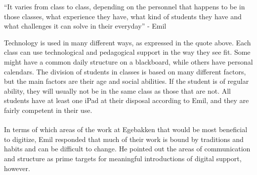 \begin{displayquote}
    ``It varies from class to class, depending on the personnel that happens to be in those classes, what experience they have, what kind of students they have and what challenges it can solve in their everyday'' - Emil
\end{displayquote}
Technology is used in many different ways, as expressed in the quote above.
Each class can use technological and pedagogical support in the way they see fit.
Some might have a common daily structure on a blackboard, while others have personal calendars.
The division of students in classes is based on many different factors, but the main factors are their age and social abilities.
If the student is of regular ability, they will usually not be in the same class as those that are not.
All students have at least one iPad at their disposal according to Emil, and they are fairly competent in their use.
\\\\
In terms of which areas of the work at Egebakken that would be most beneficial to digitize, Emil responded that much of their work is bound by traditions and habits and can be difficult to change.
He pointed out the areas of communication and structure as prime targets for meaningful introductions of digital support, however.

